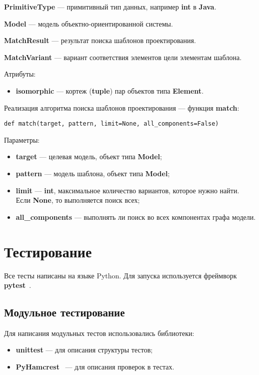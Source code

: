 \textbf{PrimitiveType} --- примитивный тип данных, например \textbf{int} в \textbf{Java}.

\textbf{Model} --- модель объектно-ориентированной системы.

\textbf{MatchResult} --- результат поиска шаблонов проектирования.

\textbf{MatchVariant} --- вариант соответствия элементов цели элементам шаблона.

Атрибуты:
\begin{itemize}
\item \textbf{isomorphic} --- кортеж (\textbf{tuple}) пар объектов типа \textbf{Element}.
\end{itemize}

Реализация алгоритма поиска шаблонов проектирования --- функция \textbf{match}:

\begin{verbatim}
def match(target, pattern, limit=None, all_components=False)
\end{verbatim}

Параметры:
\begin{itemize}
\item \textbf{target} --- целевая модель, объект типа \textbf{Model};
\item \textbf{pattern} --- модель шаблона, объект типа \textbf{Model};
\item \textbf{limit} --- \textbf{int}, максимальное количество
вариантов, которое нужно найти. Если \textbf{None}, то выполняется поиск всех;
\item \textbf{all\_components} --- выполнять ли поиск во всех компонентах графа
модели.
\end{itemize}

\section{Тестирование}

Все тесты написаны на языке Python.
Для запуска используется фреймворк \textbf{pytest}~\cite{pytest}.

\subsection{Модульное тестирование}

Для написания модульных тестов использовались библиотеки:
\begin{itemize}
\item \textbf{unittest} --- для описания структуры тестов;
\item \textbf{PyHamcrest}~\cite{PyHamcrest} --- для описания проверок в тестах.
\end{itemize}

